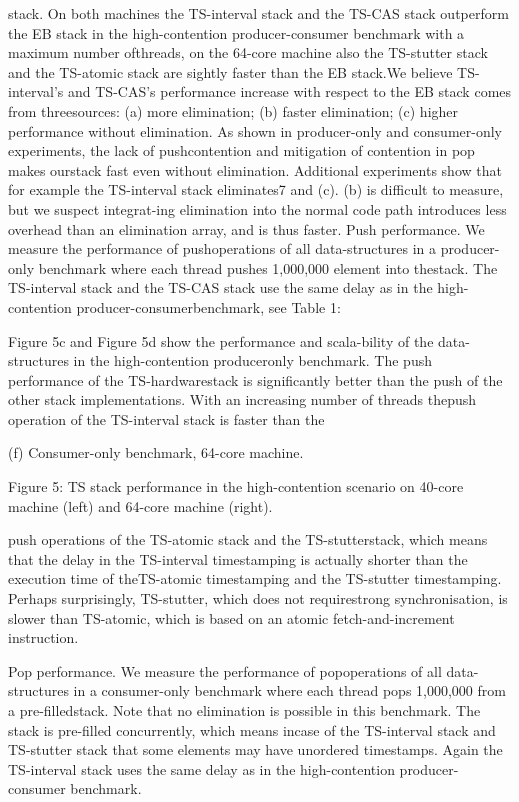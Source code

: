stack. On both machines the TS-interval stack and the TS-CAS stack outperform the EB stack in the high-contention
producer-consumer benchmark with a maximum number ofthreads, on the 64-core machine also the TS-stutter stack
and the TS-atomic stack are sightly faster than the EB stack.We believe TS-interval's and TS-CAS's performance increase with respect to the EB stack comes from threesources: (a) more elimination; (b) faster elimination; (c)
higher performance without elimination. As shown in producer-only and consumer-only experiments, the lack of pushcontention and mitigation of contention in pop makes ourstack fast even without elimination. Additional experiments
show that for example the TS-interval stack eliminates7%
and (c). (b) is difficult to measure, but we suspect integrat-ing elimination into the normal code path introduces less
overhead than an elimination array, and is thus faster.
Push performance. We measure the performance of pushoperations of all data-structures in a producer-only benchmark where each thread pushes 1,000,000 element into thestack. The TS-interval stack and the TS-CAS stack use
the same delay as in the high-contention producer-consumerbenchmark, see Table 1:

Figure 5c and Figure 5d show the performance and scala-bility of the data-structures in the high-contention produceronly benchmark. The push performance of the TS-hardwarestack is significantly better than the push of the other stack
implementations. With an increasing number of threads thepush operation of the TS-interval stack is faster than the

(f) Consumer-only benchmark, 64-core machine.

Figure 5: TS stack performance in the high-contention scenario on 40-core machine (left) and 64-core machine (right).

push operations of the TS-atomic stack and the TS-stutterstack, which means that the delay in the TS-interval timestamping is actually shorter than the execution time of theTS-atomic timestamping and the TS-stutter timestamping.
Perhaps surprisingly, TS-stutter, which does not requirestrong synchronisation, is slower than TS-atomic, which is
based on an atomic fetch-and-increment instruction.

Pop performance. We measure the performance of popoperations of all data-structures in a consumer-only benchmark where each thread pops 1,000,000 from a pre-filledstack. Note that no elimination is possible in this benchmark. The stack is pre-filled concurrently, which means incase of the TS-interval stack and TS-stutter stack that some
elements may have unordered timestamps. Again the TS-interval stack uses the same delay as in the high-contention
producer-consumer benchmark.

